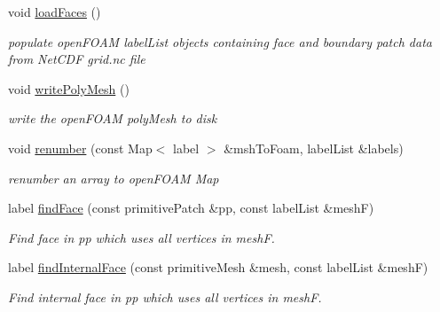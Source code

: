 \begin{DoxyCompactItemize}
\mbox{\label{classncdfGrid_a09c8ac34e94069193b00afb1b7db23f6}} 
void \mbox{\hyperlink{classncdfGrid_a09c8ac34e94069193b00afb1b7db23f6}{load\+Faces}} ()
\begin{DoxyCompactList}\small\item\em populate open\+F\+O\+AM label\+List objects containing face and boundary patch data from Net\+C\+DF grid.\+nc file \end{DoxyCompactList}\item 
\mbox{\label{classncdfGrid_a4943187aa2abf208e68520a43082e590}} 
void \mbox{\hyperlink{classncdfGrid_a4943187aa2abf208e68520a43082e590}{write\+Poly\+Mesh}} ()
\begin{DoxyCompactList}\small\item\em write the open\+F\+O\+AM poly\+Mesh to disk \end{DoxyCompactList}\item 
void \mbox{\hyperlink{classncdfGrid_a4495be0a32dad1ad42934005196bbb38}{renumber}} (const Map$<$ label $>$ \&msh\+To\+Foam, label\+List \&labels)
\begin{DoxyCompactList}\small\item\em renumber an array to open\+F\+O\+AM Map \end{DoxyCompactList}\item 
label \mbox{\hyperlink{classncdfGrid_a4f0353f650720f518189b4adfa7d3b10}{find\+Face}} (const primitive\+Patch \&pp, const label\+List \&meshF)
\begin{DoxyCompactList}\small\item\em Find face in pp which uses all vertices in meshF. \end{DoxyCompactList}\item 
label \mbox{\hyperlink{classncdfGrid_a1ce028e8c7c31e35b386ab99f993a33d}{find\+Internal\+Face}} (const primitive\+Mesh \&mesh, const label\+List \&meshF)
\begin{DoxyCompactList}\small\item\em Find internal face in pp which uses all vertices in meshF. \end{DoxyCompactList}\end{DoxyCompactItemize}

